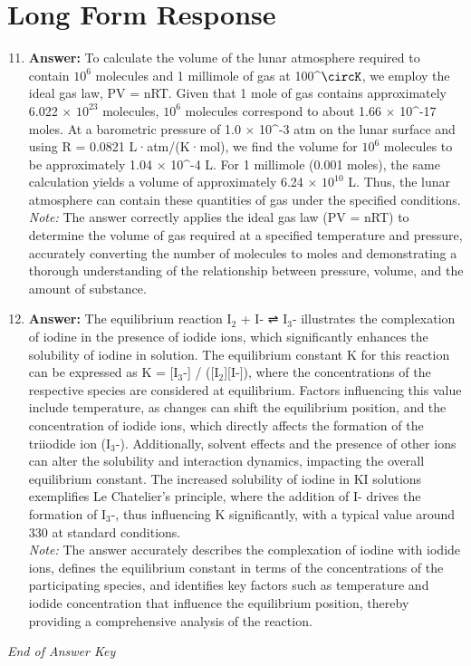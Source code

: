 \documentclass[12pt]{article}
\begin{document}
\section*{Long Form Response}
\begin{enumerate}[label=\arabic*.]
\setcounter{enumi}{10}
\item \textbf{Answer:} To calculate the volume of the lunar atmosphere required to contain $10^6$ molecules and 1 millimole of gas at 100^\ensuremath{\circK}, we employ the ideal gas law, PV = nRT. Given that 1 mole of gas contains approximately 6.022 \ensuremath{\times} $10^23$ molecules, $10^6$ molecules correspond to about 1.66 \ensuremath{\times} 10^-17 moles. At a barometric pressure of 1.0 \ensuremath{\times} 10^-3 atm on the lunar surface and using R = 0.0821 L·atm/(K·mol), we find the volume for $10^6$ molecules to be approximately 1.04 \ensuremath{\times} 10^-4 L. For 1 millimole (0.001 moles), the same calculation yields a volume of approximately 6.24 \ensuremath{\times} $10^10$ L. Thus, the lunar atmosphere can contain these quantities of gas under the specified conditions.
\\ \textit{Note:} The answer correctly applies the ideal gas law (PV = nRT) to determine the volume of gas required at a specified temperature and pressure, accurately converting the number of molecules to moles and demonstrating a thorough understanding of the relationship between pressure, volume, and the amount of substance.
\item \textbf{Answer:} The equilibrium reaction I$_{2}$ + I- ⇌ I$_{3}$- illustrates the complexation of iodine in the presence of iodide ions, which significantly enhances the solubility of iodine in solution. The equilibrium constant K for this reaction can be expressed as K = [I$_{3}$-] / ([I$_{2}$][I-]), where the concentrations of the respective species are considered at equilibrium. Factors influencing this value include temperature, as changes can shift the equilibrium position, and the concentration of iodide ions, which directly affects the formation of the triiodide ion (I$_{3}$-). Additionally, solvent effects and the presence of other ions can alter the solubility and interaction dynamics, impacting the overall equilibrium constant. The increased solubility of iodine in KI solutions exemplifies Le Chatelier's principle, where the addition of I- drives the formation of I$_{3}$-, thus influencing K significantly, with a typical value around 330 at standard conditions.
\\ \textit{Note:} The answer accurately describes the complexation of iodine with iodide ions, defines the equilibrium constant in terms of the concentrations of the participating species, and identifies key factors such as temperature and iodide concentration that influence the equilibrium position, thereby providing a comprehensive analysis of the reaction.
\end{enumerate}

\vfill
\noindent\textit{End of Answer Key}
\end{document}
